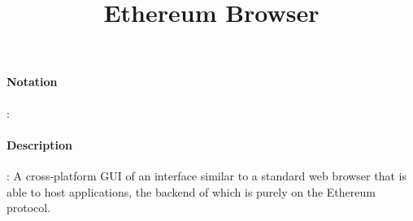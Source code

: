 \documentclass[10pt,a4paper,oneside]{scrartcl}
\author{}
\title{Ethereum Browser}
\date{}
\begin{document}
\maketitle
\paragraph{Notation}: 
\paragraph{Description}: A cross-platform GUI of an interface similar to a standard web browser that is able to host applications, the backend of which is purely on the Ethereum protocol.  
\end{document}
